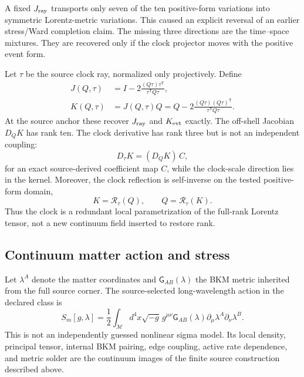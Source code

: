 \documentclass[11pt]{article}
\theoremstyle{definition}
\theoremstyle{remark}
\begin{document}
A fixed $J_{\rm ray}$ transports only seven of the ten positive-form variations into symmetric Lorentz-metric variations. This caused an explicit reversal of an earlier stress/Ward completion claim. The missing three directions are the time--space mixtures. They are recovered only if the clock projector moves with the positive event form.

Let $\tau$ be the source clock ray, normalized only projectively. Define
\begin{align}
 J(Q,\tau)&=I-2\frac{(Q\tau)\tau^{\mathsf T}}{\tau^{\mathsf T}Q\tau},\label{eq:comovingJ}\\
 K(Q,\tau)&=J(Q,\tau)Q
 =Q-2\frac{(Q\tau)(Q\tau)^{\mathsf T}}{\tau^{\mathsf T}Q\tau}.
 \label{eq:comovingK}
\end{align}
At the source anchor these recover $J_{\rm ray}$ and $K_{\rm evt}$ exactly. The off-shell Jacobian $D_QK$ has rank ten. The clock derivative has rank three but is not an independent coupling:
\begin{equation}\label{eq:clockredundancy}
 D_{\tau}K=(D_QK)\,C,
\end{equation}
for an exact source-derived coefficient map $C$, while the clock-scale direction lies in the kernel. Moreover, the clock reflection is self-inverse on the tested positive-form domain,
\begin{equation}
 K=\mathcal R_{\tau}(Q),
 \qquad Q=\mathcal R_{\tau}(K).
\end{equation}
Thus the clock is a redundant local parametrization of the full-rank Lorentz tensor, not a new continuum field inserted to restore rank.

\subsection{Continuum matter action and stress}

Let $\lambda^A$ denote the matter coordinates and $\mathsf G_{AB}(\lambda)$ the BKM metric inherited from the full source corner. The source-selected long-wavelength action in the declared class is
\begin{equation}\label{eq:matteraction}
 S_m[g,\lambda]=\frac12\int_{\mathcal M}d^4x\sqrt{-g}\,
 g^{\mu\nu}\mathsf G_{AB}(\lambda)
 \partial_{\mu}\lambda^A\partial_{\nu}\lambda^B.
\end{equation}
This is not an independently guessed nonlinear sigma model. Its local density, principal tensor, internal BKM pairing, edge coupling, active rate dependence, and metric solder are the continuum images of the finite source construction described above.
\end{document}
